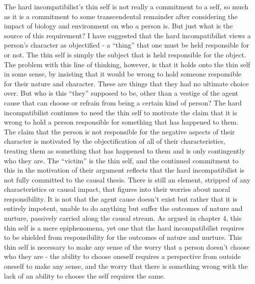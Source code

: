 \documentclass[phd,12pt,oneside,paper=letterpaper]{ubcthesis}
\begin{document}
The hard incompatibilist's thin self is not really a commitment to a self, so much as it is a commitment to some transcendental remainder after considering the impact of biology and environment on who a person is. But just what is the source of this requirement? I have suggested that the hard incompatibilist views a person's character as objectified - a ``thing'' that one must be held responsible for or not. The thin self is simply the subject that is held responsible for the object. The problem with this line of thinking, however, is that it holds onto the thin self in some sense, by insisting that it would be wrong to hold someone responsible for their nature and character. These are things that they had no ultimate choice over. But who is this ``they'' supposed to be, other than a vestige of the agent cause that can choose or refrain from being a certain kind of person? The hard incompatibilist continues to need the thin self to motivate the claim that it is wrong to hold a person responsible for something that has happened to them. The claim that the person is not responsible for the negative aspects of their character is motivated by the objectification of all of their characteristics, treating them as something that has happened to them and is only contingently who they are. The ``victim'' is the thin self, and the continued commitment to this in the motivation of their argument reflects that the hard incompatibilist is not fully committed to the causal thesis. There is still an element, stripped of any characteristics or causal impact, that figures into their worries about moral responsibility. It is not that the agent cause doesn't exist but rather that it is entirely impotent, unable to do anything but suffer the outcomes of nature and nurture, passively carried along the causal stream. As argued in chapter 4, this thin self is a mere epiphenomena, yet one that the hard incompatibilist requires to be shielded from responsibility for the outcomes of nature and nurture. This thin self is necessary to make any sense of the worry that a person doesn't choose who they are - the ability to choose oneself requires a perspective from outside oneself to make any sense, and the worry that there is something wrong with the lack of an ability to choose the self requires the same. 
\end{document}
